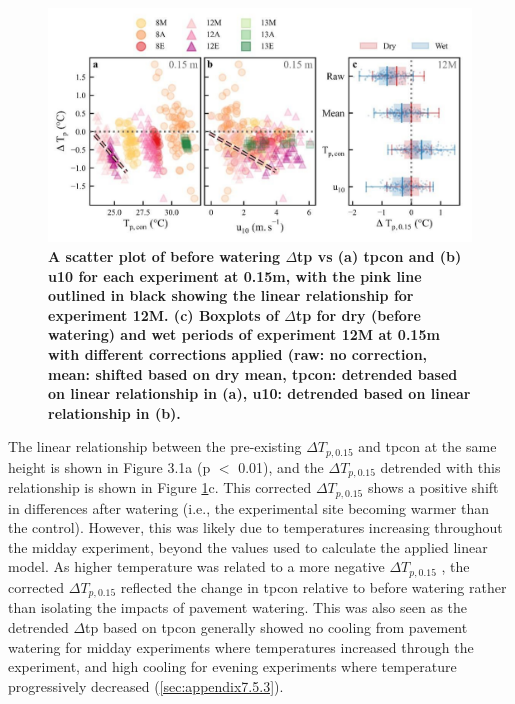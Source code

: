 \documentclass[final,3p,times,authoryear]{elsarticle}
\begin{document}
\begin{figure}
\centering
\includegraphics[trim={0 0 0 0},clip,scale=1.0]{pict011.jpg}
\caption{\bf A scatter plot of before watering $\Delta$\gls{tp} vs (a) \gls{tpcon} and (b) \gls{u10} for each experiment at 0.15m, with the pink line outlined in black showing the linear relationship for experiment 12M. (c) Boxplots of $\Delta$\gls{tp} for dry (before watering) and wet periods of experiment 12M at 0.15m with different corrections applied (raw: no correction, mean: shifted based on dry mean, \gls{tpcon}: detrended based on linear relationship in (a), \gls{u10}: detrended based on linear relationship in (b).}
 \label{fig:3.1}
\end{figure}

The linear relationship between the pre-existing $\Delta$$T_{p,0.15}$ and \gls{tpcon} at the same height is shown in Figure 3.1a (p $<$ 0.01), and the $\Delta$$T_{p,0.15}$ detrended with this relationship is shown in Figure \ref{fig:3.1}c. This corrected $\Delta$$T_{p,0.15}$ shows a positive shift in differences after watering (i.e., the experimental site becoming warmer than the control). However, this was likely due to temperatures increasing throughout the midday experiment, beyond the values used to calculate the applied linear model. As higher temperature was related to a more negative $\Delta$$T_{p,0.15}$ , the corrected $\Delta$$T_{p,0.15}$ reflected the change in \gls{tpcon} relative to before watering rather than isolating the impacts of pavement watering. This was also seen as the detrended $\Delta$\gls{tp} based on \gls{tpcon} generally showed no cooling from pavement watering for midday experiments where temperatures increased through the experiment, and high cooling for evening experiments where temperature progressively decreased (\ref{sec:appendix7.5.3}).
\end{document}
